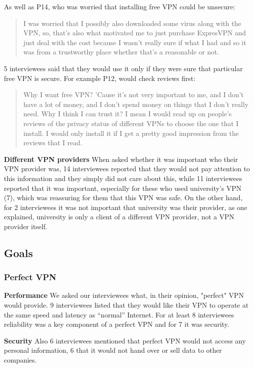 As well as P14, who was worried that installing free VPN could be unsecure:
\begin{quote}I was worried that I possibly also downloaded some virus along with the VPN, so, that's also what motivated me to just purchase ExpresVPN and just deal with the cost because I wasn't really sure if what I had and so it was from a trustworthy place whether that's a reasonable or not.\end{quote}

5 interviewees said that they would use it only if they were sure that particular free VPN is secure. For example P12, would check reviews first:
\begin{quote}Why I want free VPN? 'Cause it's not very important to me, and I don't have a lot of money, and I don't spend money on things that I don't really need. Why I think I can trust it? I mean I would read up on people's reviews of the privacy status of different VPNs to choose the one that I install. I would only install it if I get a pretty good impression from the reviews that I read.\end{quote}

\textbf{Different VPN providers} When asked whether it was important who their VPN provider was, 14 interviewees reported that they would not pay attention to this information and they simply did not care about this, while 11 interviewees reported that it was important, especially for these who used university’s VPN (7), which was reassuring for them that this VPN was safe. On the other hand, for 2 interviewees it was not important that university was their provider, as one explained, university is only a client of a different VPN provider, not a VPN provider itself. 


\subsection{Goals}

\subsubsection{Perfect VPN}
\textbf{Performance} We asked our interviewees what, in their opinion, "perfect" VPN would provide. 9 interviewees listed that they would like their VPN to operate at the same speed and latency as  “normal” Internet. For at least 8 interviewees reliability was a key component of a perfect VPN and for 7 it was security. 

\textbf{Security} Also 6 interviewees mentioned that perfect VPN would not access any personal information, 6 that it would not hand over or sell data to other companies. 

